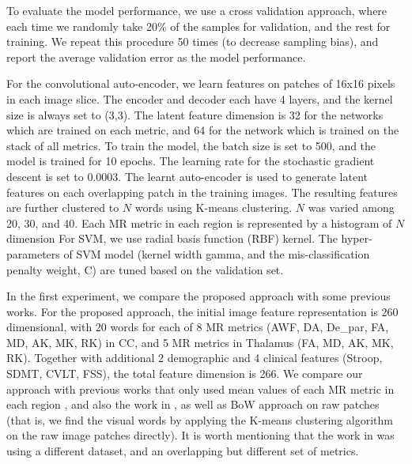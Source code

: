 \documentclass[letterpaper, 10 pt, conference]{ieeeconf}  %
\begin{document}
To evaluate the model performance, we use  a cross validation approach, where each time we randomly take 20\% of the samples for validation, and the rest for training. 
We repeat this procedure 50 times (to decrease sampling bias), and report the average validation error as the model performance.

For the convolutional auto-encoder, we learn features on patches of 16x16 pixels in each image slice.
The encoder and decoder each have 4 layers, and the kernel size is always set to (3,3). 
The latent feature dimension is 32 for the networks which are trained on each metric, and 64 for the network which is trained on the stack of all metrics.
To train the model, the batch size is set to 500, and the model is trained for 10 epochs. The learning rate for the stochastic gradient descent is set to 0.0003.
The learnt auto-encoder is used to generate latent features on each overlapping patch in the training images. The resulting features are further clustered to $N$ words using K-means clustering. $N$ was varied among 20, 30, and 40. Each  MR metric in each region is represented by a histogram of $N$ dimension
For SVM, we use radial basis function (RBF) kernel. 
The hyper-parameters of SVM model (kernel width gamma, and the mis-classification penalty weight, C) are tuned based on the validation set.




In the first experiment, we compare the proposed approach with some previous works. 
For the proposed approach, the initial image feature representation is 260 dimensional, with 20 words for each of 8 MR metrics (AWF, DA, De\_par, FA, MD, AK, MK, RK) in CC, and 5 MR metrics in Thalamus (FA, MD, AK, MK, RK).
Together with additional 2 demographic and 4 clinical features (Stroop, SDMT, CVLT, FSS), the total feature dimension is 266.
We compare our approach with previous works that only used mean values of each MR metric in each region \cite{minaee1}, and also the work in \cite{yuanyi}, as well as BoW approach on raw patches \cite{minaee1} (that is, we find the visual words by applying the K-means clustering algorithm on the raw image patches directly).
It is worth  mentioning that the work in \cite{yuanyi} was using a different dataset, and an overlapping but different set of metrics.
\end{document}
